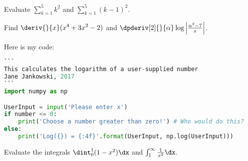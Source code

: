 \documentclass{article}
\begin{document}
\pagebreak

%
%
% 

\begin{homeworkProblem}[18]
    Evaluate $\displaystyle\sum_{k=1}^{5} k^2$ and $\sum_{k=1}^{5} (k - 1)^2$. %

    Find $\displaystyle\deriv{}{x} (x^4 + 3x^2 - 2)$ and $\dpderiv[2]{}{\alpha} \log\left|\frac{\alpha^2-7}{x}\right|$. 
\end{homeworkProblem}

\begin{homeworkProblem}
Here is my code: 
\begin{lstlisting}[language=Python]
```
This calculates the logarithm of a user-supplied number
Jane Jankowski, 2017
```
import numpy as np

UserInput = input('Please enter x')
if number <= 0:
	print('Choose a number greater than zero!') # Who would do this?
else:
	print('Log({}) = {:4f}'.format(UserInput, np.log(UserInput)))	
\end{lstlisting}
\end{homeworkProblem}

\begin{homeworkProblem}[3]
    Evaluate the integrals
    $\dint_0^1 (1 - x^2) \dx$ %
    and
    $\int_1^{\infty} \frac{1}{x^2} \dx$.
\end{homeworkProblem}
\end{document}
